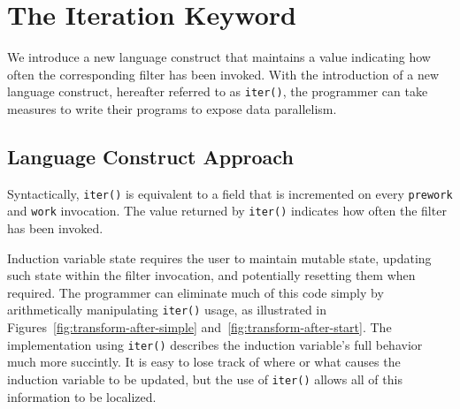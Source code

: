 %  
%
%
%
%
%
%    
%
%

\section{The Iteration Keyword}
\label{sec:iteration}
We introduce a new language construct that maintains a value 
indicating how often the corresponding filter has been invoked.  
With the introduction of a new language construct, hereafter referred to as {\tt iter()}, the programmer can take measures to write their programs to expose data parallelism.  

\subsection{Language Construct Approach}
Syntactically, {\tt iter()} is equivalent to a field that is incremented on every {\tt prework} and {\tt work} invocation.  The value returned by {\tt iter()} indicates how often the filter has been invoked.  

Induction variable state requires the user to maintain mutable state, updating such state within the filter invocation, and potentially resetting them when required. The programmer can eliminate much of this code simply by arithmetically manipulating {\tt iter()} usage, as illustrated in Figures~\ref{fig:transform-after-simple} and~\ref{fig:transform-after-start}.  The implementation using {\tt iter()} describes the induction variable's full behavior much more succintly.  It is easy to lose track of where or what causes the induction variable to be updated, but the use of {\tt iter()} allows all of this information to be localized.

